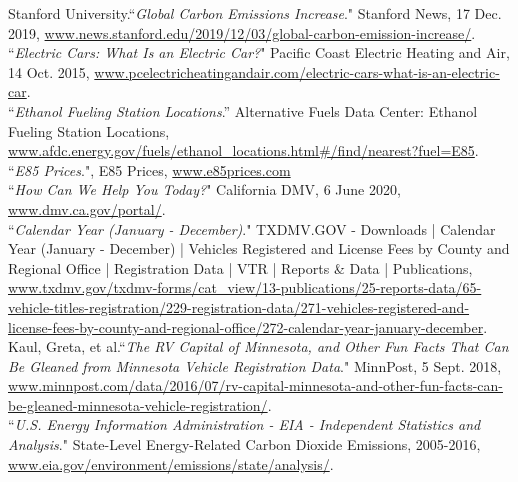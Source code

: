 \documentclass[answers]{exam}
\begin{document}
\begin{thebibliography}{99}
Stanford University.``\textit{Global Carbon Emissions Increase}." Stanford News, 17 Dec. 2019, \url{www.news.stanford.edu/2019/12/03/global-carbon-emission-increase/}.
\\
``\textit{Electric Cars: What Is an Electric Car?}" Pacific Coast Electric Heating and Air, 14 Oct. 2015, \url{www.pcelectricheatingandair.com/electric-cars-what-is-an-electric-car}.
\\
``\textit{Ethanol Fueling Station Locations}.'' Alternative Fuels Data Center: Ethanol Fueling Station Locations, \url{www.afdc.energy.gov/fuels/ethanol_locations.html#/find/nearest?fuel=E85}.
\\
``\textit{E85 Prices}.", E85 Prices, \url{www.e85prices.com}
\\
 ``\textit{How Can We Help You Today?}" California DMV, 6 June 2020, \url{www.dmv.ca.gov/portal/}.
\\
``\textit{Calendar Year (January - December)}." TXDMV.GOV - Downloads | Calendar Year (January - December) | Vehicles Registered and License Fees by County and Regional Office | Registration Data | VTR | Reports \& Data | Publications, \url{www.txdmv.gov/txdmv-forms/cat_view/13-publications/25-reports-data/65-vehicle-titles-registration/229-registration-data/271-vehicles-registered-and-license-fees-by-county-and-regional-office/272-calendar-year-january-december}.
\\
 Kaul, Greta, et al.``\textit{The RV Capital of Minnesota, and Other Fun Facts That Can Be Gleaned from Minnesota Vehicle Registration Data}." MinnPost, 5 Sept. 2018, \url{www.minnpost.com/data/2016/07/rv-capital-minnesota-and-other-fun-facts-can-be-gleaned-minnesota-vehicle-registration/}.
\\
``\textit{U.S. Energy Information Administration - EIA - Independent Statistics and Analysis}." State-Level Energy-Related Carbon Dioxide Emissions, 2005-2016, \url{www.eia.gov/environment/emissions/state/analysis/}.
\\




\end{thebibliography}
\end{document}
